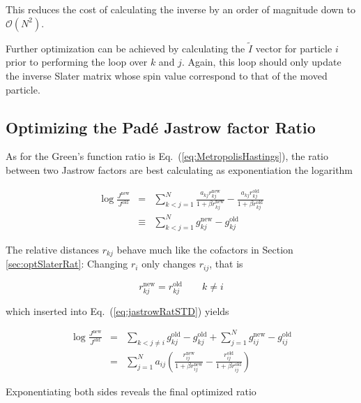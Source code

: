 This reduces the cost of calculating the inverse by an order of magnitude down to $\mathcal{O}(N^2)$.

Further optimization can be achieved by calculating the $\tilde I$ vector for particle $i$ prior to performing the loop over $k$ and $j$. Again, this loop should only update the inverse Slater matrix whose spin value correspond to that of the moved particle.

\subsection{Optimizing the Padé Jastrow factor Ratio}

As for the Green's function ratio is Eq.~(\ref{eq:MetropolisHastings}), the ratio between two Jastrow factors are best calculating as exponentiation the logarithm

\begin{eqnarray}
 \log \frac{J^\mathrm{new}}{J^\mathrm{old}} &=& \sum_{k<j = 1}^N \frac{a_{kj}r^\mathrm{new}_{kj}}{1 + \beta r^\mathrm{new}_{kj}} - \frac{a_{kj}r^\mathrm{old}_{kj}}{1 + \beta r^\mathrm{old}_{kj}} \\
                      &\equiv& \sum_{k<j = 1}^N g^\mathrm{new}_{kj} - g^\mathrm{old}_{kj} \label{eq:jastrowRatSTD}
\end{eqnarray}

The relative distances $r_{kj}$ behave much like the cofactors in Section \ref{sec:optSlaterRat}: Changing $r_i$ only changes $r_{ij}$, that is

\begin{equation}
 r^\mathrm{new}_{kj} = r^\mathrm{old}_{kj} \qquad k \ne i 
\end{equation}

which inserted into Eq.~(\ref{eq:jastrowRatSTD}) yields

\begin{eqnarray}
  \log\frac{J^\mathrm{new}}{J^\mathrm{old}} &=& \sum_{k<j \ne i} g^\mathrm{old}_{kj} - g^\mathrm{old}_{kj} + \sum_{j = 1}^N g^\mathrm{new}_{ij} - g^\mathrm{old}_{ij} \nonumber\\
                                            &=& \sum_{j = 1}^N a_{ij}\left(\frac{r^\mathrm{new}_{ij}}{1 + \beta r^\mathrm{new}_{ij}} - \frac{r^\mathrm{old}_{ij}}{1 + \beta r^\mathrm{old}_{ij}}\right)
\end{eqnarray}

Exponentiating both sides reveals the final optimized ratio 



